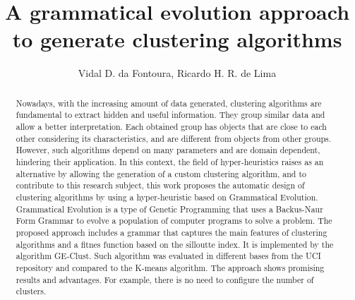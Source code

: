 \documentclass[journal]{IEEEtran}
\begin{document}
	
	\title{A grammatical evolution approach to generate clustering algorithms}
	
	
	\author{
		Vidal D. da Fontoura,
		Ricardo H. R. de Lima
	}
	
	
	\maketitle
	


	\begin{abstract}


Nowadays, with the increasing amount of data generated, clustering algorithms are fundamental to extract hidden and useful information. They group similar data and allow a better interpretation. Each obtained group has objects that are close to each other considering its characteristics, and are different from objects from other groups. However, such algorithms depend on many parameters and are domain dependent, hindering their application. In this context, the field of hyper-heuristics raises as an alternative by allowing the generation of a custom clustering algorithm, and to contribute to this research subject, this work proposes the automatic design of clustering algorithms by using a hyper-heuristic based on Grammatical Evolution. Grammatical Evolution is a type of Genetic Programming that uses a Backus-Naur Form Grammar to evolve a population of computer programs to solve a problem. The proposed approach includes a grammar that captures the main features of clustering algorithms and a fitnes function based on the silloutte index. It is implemented by the algorithm GE-Clust. Such algorithm was evaluated in different bases from the UCI repository and compared to the K-means algorithm. The approach  shows promising results  and advantages. For example, there is no need to configure the number of clusters.
		
	\end{abstract}
	
\end{document}
